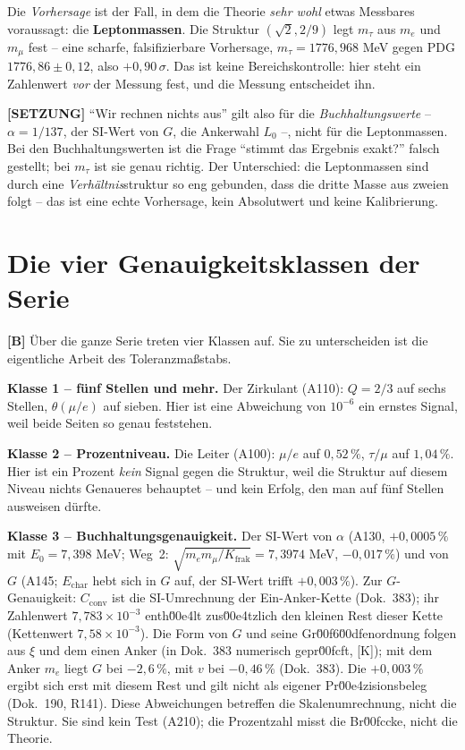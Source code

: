 Die \emph{Vorhersage} ist der Fall, in dem die Theorie \emph{sehr wohl} etwas
Messbares voraussagt: die \textbf{Leptonmassen}. Die Struktur $(\sqrt2, 2/9)$
legt $m_\tau$ aus $m_e$ und $m_\mu$ fest -- eine scharfe, falsifizierbare
Vorhersage, $m_\tau = 1776{,}968$ MeV gegen PDG $1776{,}86\pm0{,}12$, also
$+0{,}90\,\sigma$. Das ist keine Bereichskontrolle: hier steht ein Zahlenwert
\emph{vor} der Messung fest, und die Messung entscheidet ihn.

\textbf{[SETZUNG]} \enquote{Wir rechnen nichts aus} gilt also für die
\emph{Buchhaltungswerte} -- $\alpha = 1/137$, der SI-Wert von $G$, die Ankerwahl
$L_0$ --, nicht für die Leptonmassen. Bei den Buchhaltungswerten ist die Frage
\enquote{stimmt das Ergebnis exakt?} falsch gestellt; bei $m_\tau$ ist sie genau
richtig. Der Unterschied: die Leptonmassen sind durch eine \emph{Verhältnis}struktur
so eng gebunden, dass die dritte Masse aus zweien folgt -- das ist eine echte
Vorhersage, kein Absolutwert und keine Kalibrierung.

\section{Die vier Genauigkeitsklassen der Serie}

\textbf{[B]} Über die ganze Serie treten vier Klassen auf. Sie zu unterscheiden
ist die eigentliche Arbeit des Toleranzmaßstabs.

\textbf{Klasse 1 -- fünf Stellen und mehr.} Der Zirkulant (A110): $Q=2/3$ auf
sechs Stellen, $\theta(\mu/e)$ auf sieben. Hier ist eine Abweichung von
$10^{-6}$ ein ernstes Signal, weil beide Seiten so genau feststehen.

\textbf{Klasse 2 -- Prozentniveau.} Die Leiter (A100): $\mu/e$ auf $0{,}52\,\%$,
$\tau/\mu$ auf $1{,}04\,\%$. Hier ist ein Prozent \emph{kein} Signal gegen die
Struktur, weil die Struktur auf diesem Niveau nichts Genaueres behauptet -- und
kein Erfolg, den man auf fünf Stellen ausweisen dürfte.

\textbf{Klasse 3 -- Buchhaltungsgenauigkeit.} Der SI-Wert von $\alpha$ (A130,
$+0{,}0005\,\%$ mit $E_0=7{,}398$ MeV; Weg~2: $\sqrt{m_em_\mu/K_\text{frak}}=7{,}3974$ MeV,
$-0{,}017\,\%$) und von $G$ (A145; $E_\text{char}$ hebt sich in $G$ auf, der
SI-Wert trifft $+0{,}003\,\%$). Zur $G$-Genauigkeit: $C_{\text{conv}}$ ist die
SI-Umrechnung der Ein-Anker-Kette (Dok.~383); ihr Zahlenwert $7{,}783\times10^{-3}$
enth\u00e4lt zus\u00e4tzlich den kleinen Rest dieser Kette (Kettenwert $7{,}58\times10^{-3}$).
Die Form von $G$ und seine Gr\u00f6\u00dfenordnung folgen aus $\xi$ und dem einen Anker
(in Dok.~383 numerisch gepr\u00fcft, [K]); mit dem Anker $m_e$ liegt $G$ bei $-2{,}6\,\%$,
mit $v$ bei $-0{,}46\,\%$ (Dok.~383). Die $+0{,}003\,\%$ ergibt sich erst mit
diesem Rest und gilt nicht als eigener Pr\u00e4zisionsbeleg (Dok.~190, R141).
Diese Abweichungen betreffen die Skalenumrechnung, nicht die Struktur. Sie sind kein
Test (A210); die Prozentzahl misst die Br\u00fccke, nicht die Theorie.

